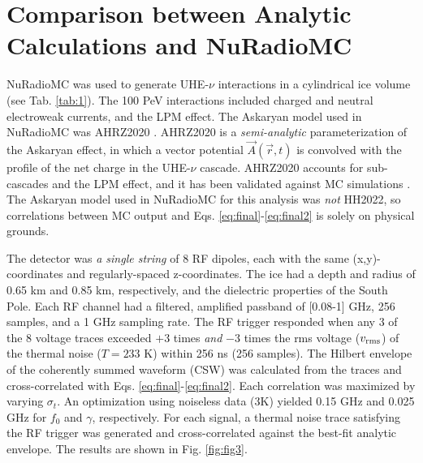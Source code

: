 \documentclass[amsmath,amssymb,aps,prd,10pt,twocolumn,showkeys]{revtex4}
\begin{document}
\section{Comparison between Analytic Calculations and NuRadioMC}
\label{sec:sim}

NuRadioMC was used to generate UHE-$\nu$ interactions in a cylindrical ice volume (see Tab. \ref{tab:1}).  The 100 PeV interactions included charged and neutral electroweak currents, and the LPM effect.  The Askaryan model used in NuRadioMC was AHRZ2020 \cite{PhysRevD.101.083005}.  AHRZ2020 is a \textit{semi-analytic} parameterization of the Askaryan effect, in which a vector potential $\vec{A}(\vec{r},t)$ is convolved with the profile of the net charge in the UHE-$\nu$ cascade.  AHRZ2020 accounts for sub-cascades and the LPM effect, and it has been validated against MC simulations \cite{zhs,10.1103/physrevd.84.103003}.  The Askaryan model used in NuRadioMC for this analysis was \textit{not} HH2022, so correlations between MC output and Eqs. \ref{eq:final}-\ref{eq:final2} is solely on physical grounds.

The detector was \textit{a single string} of 8 RF dipoles, each with the same (x,y)-coordinates and regularly-spaced z-coordinates.  The ice had a depth and radius of 0.65 km and 0.85 km, respectively, and the dielectric properties of the South Pole.  Each RF channel had a filtered, amplified passband of [0.08-1] GHz, 256 samples, and a 1 GHz sampling rate.  The RF trigger responded when any 3 of the 8 voltage traces exceeded $+3$ times \textit{and} $-3$ times the rms voltage ($v_{\rm rms}$) of the thermal noise ($T=233$ K) within 256 ns (256 samples).  The Hilbert envelope of the coherently summed waveform (CSW) was calculated from the traces and cross-correlated with Eqs. \ref{eq:final}-\ref{eq:final2}.  Each correlation was maximized by varying $\sigma_t$.  An optimization using noiseless data (3K) yielded 0.15 GHz and 0.025 GHz for $f_0$ and $\gamma$, respectively.  For each signal, a thermal noise trace satisfying the RF trigger was generated and cross-correlated against the best-fit analytic envelope.  The results are shown in Fig. \ref{fig:fig3}.
\end{document}
